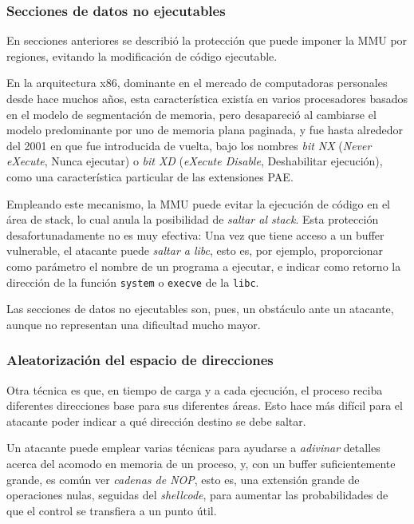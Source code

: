\documentclass[11pt,fleqn]{book} %
\begin{document}
\subsubsection{Secciones de datos no ejecutables}
\label{sec-5-6-1-5}


En secciones anteriores se describió la protección que puede imponer la
MMU por regiones, evitando la modificación de código ejecutable.

En la arquitectura x86, dominante en el mercado de computadoras
personales desde hace muchos años, esta característica existía en
varios procesadores basados en el modelo de segmentación de memoria,
pero desapareció al cambiarse el modelo predominante por uno de
memoria plana paginada, y fue hasta alrededor del 2001 en que fue
introducida de vuelta, bajo los nombres \emph{bit NX} (\emph{Never eXecute},
Nunca ejecutar) o \emph{bit XD} (\emph{eXecute Disable}, Deshabilitar
ejecución), como una característica particular de las extensiones PAE.

Empleando este mecanismo, la MMU puede evitar la ejecución de código
en el área de stack, lo cual anula la posibilidad de \emph{saltar al stack}. Esta protección desafortunadamente no es muy efectiva: Una vez
que tiene acceso a un buffer vulnerable, el atacante puede \emph{saltar a libc}, esto es, por ejemplo, proporcionar como parámetro el nombre de
un programa a ejecutar, e indicar como retorno la dirección de la
función \texttt{system} o \texttt{execve} de la \texttt{libc}.

Las secciones de datos no ejecutables son, pues, un obstáculo ante un
atacante, aunque no representan una dificultad mucho mayor.
\subsubsection{Aleatorización del espacio de direcciones}
\label{sec-5-6-1-6}


Otra técnica es que, en tiempo de carga y a cada ejecución, el proceso
reciba diferentes direcciones base para sus diferentes áreas. Esto
hace más difícil para el atacante poder indicar a qué dirección
destino se debe saltar.

Un atacante puede emplear varias técnicas para ayudarse a \emph{adivinar}
detalles acerca del acomodo en memoria de un proceso, y, con un
buffer suficientemente grande, es común ver \emph{cadenas de NOP}, esto
es, una extensión grande de operaciones nulas, seguidas del
\emph{shellcode}, para aumentar las probabilidades de que el control se
transfiera a un punto útil.
\end{document}
